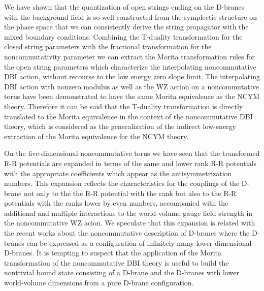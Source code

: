 \documentclass[12pt,a4paper]{article}
\begin{document}
We have shown that the quantization of open strings ending on the 
D-branes with the background \coordHE{} field is so well constructed
from the symplectic structure on the phase space that
we can consistently derive the string propagator with the mixed boundary
conditions. Combining the T-duality transformation for the closed string
parameters with the fractional transformation for the noncommutativity
parameter we can extract the Morita transformation rules for the open
string parameters which characterize the interpolating noncommutative
DBI action, without recourse to the low energy zero slope limit.
The interpolating DBI action with nonzero modulus \myHighlight{$\Phi$}\coordHE{} as well as
the WZ action on a noncommutative torus have been demonstrated to have
the same Morita equivalence as the NCYM theory. Therefore 
it can be said that the T-duality transformation is 
directly translated to the Morita equivalence in the context of 
the noncommutative DBI theory, which is considered as the generalization
of the indirect low-energy extraction of the Morita equivalence
for the NCYM theory. 

On the five-dimensional noncommutative torus
we have seen that the transformed R-R potentials are expanded in 
terms of the same and lower rank R-R potentials with the appropriate
coefficients which appear as the antisymmetrization numbers.
This expansion reflects the characteristics for the couplings of the
D\coordHE{}-brane not only to the the R-R potential with the \coordHE{} rank 
but also to the R-R potentials with the ranks lower 
by even numbers, accompanied with the additional and
multiple interactions to the world-volume gauge field strength
in the noncommutative WZ acion. 
We speculate that this expansion is related with the recent
works about the noncommutative description of D-branes 
\cite{ICSK} where the D-branes can be expressed as a configuration of
infinitely many lower dimensional D-branes.
It is tempting to suspect
that the application of the Morita transformation of the
noncommutative DBI theory is useful to build the nontrivial
bound state consisting of a D\coordHE{}-brane and the D-branes with lower 
world-volume dimensions from a pure D\coordHE{}-brane configuration.
\end{document}
